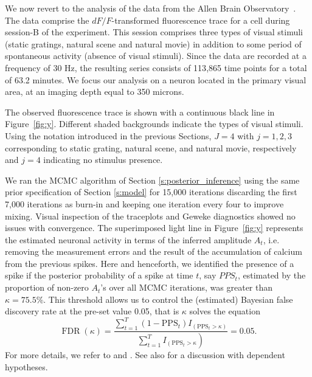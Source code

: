 We now revert to the analysis of the data from the Allen Brain Observatory~\parencite{allen}. The data comprise the $dF/F$-transformed fluorescence trace for a cell during session-B of the experiment. This session comprises three types of visual stimuli (static gratings, natural scene and natural movie) in addition to some period of spontaneous activity (absence of visual stimuli). Since the data are recorded at a frequency of $30$ Hz, the resulting series consists of 113{,}865 time points for a total of 63.2 minutes. 
We focus our analysis on a neuron located in the primary visual area, at an imaging depth equal to 350 microns. %

The observed fluorescence trace is shown with a continuous black line in Figure~\ref{fig:y}. Different shaded backgrounds indicate the types of visual stimuli.
Using the notation introduced in the previous Sections, $J=4$ with $j=1, 2, 3$ corresponding to static grating, natural scene, and natural movie, respectively and $j=4$ indicating no stimulus presence. 


We ran the MCMC algorithm of Section \ref{s:posterior_inference} using the same prior specification of Section \ref{s:model} for 15{,}000 iterations discarding the first 7{,}000 iterations as burn-in and keeping one iteration every four to improve mixing.  Visual inspection of the traceplots and Geweke diagnostics showed no issues with convergence. 
%
The superimposed light line in Figure~\ref{fig:y} represents the estimated neuronal activity in terms of the inferred amplitude $A_t$, i.e. removing the measurement errors and the result of the accumulation of calcium from the previous spikes. Here and henceforth, we identified the presence of a spike if the  posterior probability of a spike at time $t$, say $PPS_t$, estimated by the proportion of non-zero $A_t$'s over all MCMC iterations, was greater than  $\kappa=75.5\%$. This threshold allows us to control the (estimated) Bayesian false discovery rate at the pre-set value 0.05, that is $\kappa$ solves the equation $$\operatorname{FDR}\left(\kappa\right)=\frac{\sum_{t=1}^{T}\left(1-\mathrm{PPS}_{t}\right) I_{\left(\mathrm{PPS}_{t}>\kappa\right)}}{ \left.\sum_{t=1}^{T} I_{\left(\mathrm{PPS}_{t}>\kappa\right.}\right)}=0.05.$$ For more details, we refer to \textcite{newton2004} and \textcite{Muller07}. See also \textcite{SunReich2015} for a discussion with dependent hypotheses.
%

